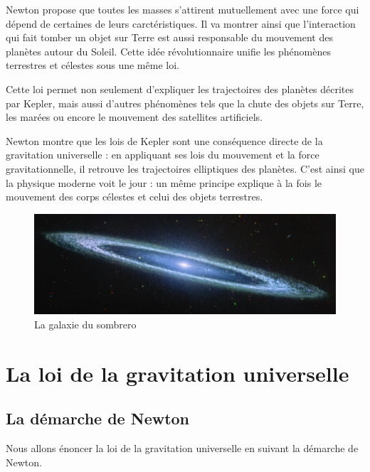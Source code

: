 \documentclass[
  letterpaper,
  DIV=11,
  numbers=noendperiod]{scrartcl}
\theoremstyle{definition}
\theoremstyle{definition}
\theoremstyle{definition}
\theoremstyle{remark}
\begin{document}
Newton propose que toutes les masses s'attirent mutuellement avec une
force qui dépend de certaines de leurs carctéristiques. Il va montrer
ainsi que l'interaction qui fait tomber un objet sur Terre est aussi
responsable du mouvement des planètes autour du Soleil. Cette idée
révolutionnaire unifie les phénomènes terrestres et célestes sous une
même loi.

Cette loi permet non seulement d'expliquer les trajectoires des planètes
décrites par Kepler, mais aussi d'autres phénomènes tels que la chute
des objets sur Terre, les marées ou encore le mouvement des satellites
artificiels.

Newton montre que les lois de Kepler sont une conséquence directe de la
gravitation universelle : en appliquant ses lois du mouvement et la
force gravitationnelle, il retrouve les trajectoires elliptiques des
planètes. C'est ainsi que la physique moderne voit le jour : un même
principe explique à la fois le mouvement des corps célestes et celui des
objets terrestres.

\begin{figure}[H]

{\centering \includegraphics{figures/grav/galaxie-sombrero.pdf}

}

\caption{La galaxie du sombrero}

\end{figure}%

\section{La loi de la gravitation
universelle}\label{la-loi-de-la-gravitation-universelle-1}

\subsection{La démarche de Newton}\label{la-duxe9marche-de-newton}

Nous allons énoncer la loi de la gravitation universelle en suivant la
démarche de Newton.
\end{document}
